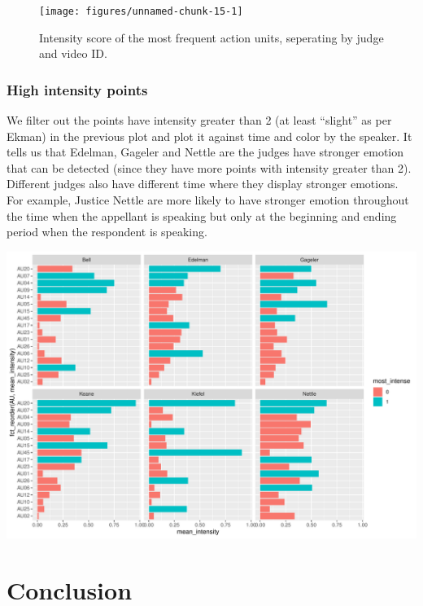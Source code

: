 \documentclass{monashthesis}
\begin{document}
\begin{figure}

{\centering \texttt{[image: figures/unnamed-chunk-15-1]} 

}

\caption{Intensity score of the most frequent action units, seperating by judge and video ID.\label{fig:intensity_by_au}}\label{fig:unnamed-chunk-15}
\end{figure}

\hypertarget{high-intensity-points}{%
\subsection{High intensity points}\label{high-intensity-points}}

We filter out the points have intensity greater than 2 (at least ``slight'' as per Ekman) in the previous plot and plot it against time and color by the speaker. It tells us that Edelman, Gageler and Nettle are the judges have stronger emotion that can be detected (since they have more points with intensity greater than 2). Different judges also have different time where they display stronger emotions. For example, Justice Nettle are more likely to have stronger emotion throughout the time when the appellant is speaking but only at the beginning and ending period when the respondent is speaking.

\begin{center}\includegraphics[width=1\linewidth]{figures/unnamed-chunk-16-1} \end{center}

\hypertarget{conclusion}{%
\chapter{Conclusion}\label{conclusion}}
\end{document}

